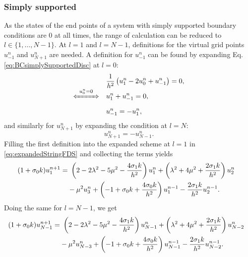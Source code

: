 \subsubsection{Simply supported}
As the states of the end points of a system with simply supported boundary conditions are $0$ at all times, the range of calculation can be reduced to $l\in \{ 1, \hdots, N-1\}$. At $l=1$ and $l=N-1$, definitions for the virtual grid points $u_{-1}^n$ and $u_{N+1}^n$ are needed. A definition for $u_{-1}^n$ can be found by expanding Eq. \eqref{eq:BCsimplySupportedDisc} at $l = 0$:
\begin{align}
    &\frac{1}{h^2}\left(u_1^n - 2 u_0^n + u_{-1}^n\right) = 0,\nonumber\\[-1em]
    \xLeftrightarrow{\mystrut\ u^n_0 = 0\ } \quad & u_1^n + u_{-1}^n = 0,\nonumber\\[0.25em]
    &u_{-1}^n = -u_1^n,\label{eq:simplySupportedResult}
\end{align}
and similarly for $u_{N+1}^n$ by expanding the condition at $l=N$:
\begin{equation*}
    u_{N+1}^n = -u_{N-1}^n.
\end{equation*}
Filling the first definition into the expanded scheme at $l=1$ in \eqref{eq:expandedStringFDS} and collecting the terms yields
\begin{equation}
    \begin{aligned}
        \!\!\!\!\!(1+\sigma_{0} k) u_1^{n+1} =&\ \left(2 - 2\lambda^2 - 5\mu^2 - \frac{4\sigma_{1} k}{h^2}\right) u_1^n + \left(\lambda^2 + 4\mu^2 + \frac{2\sigma_{1} k}{h^2}\right) u_{2}^n \\
        &-\mu^2u_3^n+ \left(-1+\sigma_{0} k + \frac{4\sigma_{0} k}{h^2}\right)u_1^{n-1} - \frac{2\sigma_{1} k}{h^2}u_{2}^{n-1}.
    \end{aligned}
\end{equation}
Doing the same for $l=N-1$, we get
\begin{equation}
    \begin{aligned}
        \!\!\!\!\!(1+\sigma_{0} k) u_{N-1}^{n+1} =&\ \left(2 - 2\lambda^2 - 5\mu^2 - \frac{4\sigma_{1} k}{h^2}\right) u_{N-1}^n + \left(\lambda^2 + 4\mu^2 + \frac{2\sigma_{1} k}{h^2}\right) u_{N-2}^n \\
        &-\mu^2u_{N-3}^n+ \left(-1+\sigma_{0} k + \frac{4\sigma_{0} k}{h^2}\right)u_{N-1}^{n-1} - \frac{2\sigma_{1} k}{h^2}u_{N-2}^{n-1}.
    \end{aligned}
\end{equation}

